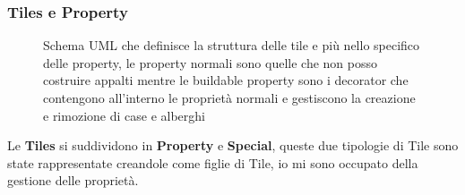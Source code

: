 \subsubsection{Tiles e Property}
\begin{figure}[H]
    \centering
    \caption{Schema UML che definisce la struttura delle tile e più nello specifico delle property, 
    le property normali sono quelle che non posso costruire appalti mentre le buildable property sono i decorator che contengono all'interno le proprietà normali e gestiscono
    la creazione e rimozione di case e alberghi}
	\label{img:Property}
\end{figure}
Le \textbf{Tiles} si suddividono in \textbf{Property} e \textbf{Special}, queste due tipologie di Tile sono state rappresentate creandole come figlie di Tile,
io mi sono occupato della gestione delle proprietà.\newline

